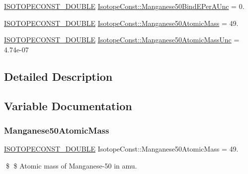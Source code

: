 \begin{DoxyCompactItemize}
\mbox{\hyperlink{group___isotope_const-_macros_ga8f45a7272ce02c0b4c65c44636ed719a}{I\+S\+O\+T\+O\+P\+E\+C\+O\+N\+S\+T\+\_\+\+D\+O\+U\+B\+LE}} \mbox{\hyperlink{group___isotope_const-_manganese-_mn50_gabe7006e5a4406fa0fc6c46e5eb3d907c}{Isotope\+Const\+::\+Manganese50\+Bind\+E\+Per\+A\+Unc}} = 0.
\item 
\mbox{\hyperlink{group___isotope_const-_macros_ga8f45a7272ce02c0b4c65c44636ed719a}{I\+S\+O\+T\+O\+P\+E\+C\+O\+N\+S\+T\+\_\+\+D\+O\+U\+B\+LE}} \mbox{\hyperlink{group___isotope_const-_manganese-_mn50_gadbbf4990db9fc099d645f471e290f6ec}{Isotope\+Const\+::\+Manganese50\+Atomic\+Mass}} = 49.
\item 
\mbox{\hyperlink{group___isotope_const-_macros_ga8f45a7272ce02c0b4c65c44636ed719a}{I\+S\+O\+T\+O\+P\+E\+C\+O\+N\+S\+T\+\_\+\+D\+O\+U\+B\+LE}} \mbox{\hyperlink{group___isotope_const-_manganese-_mn50_gaecb3e3db57f9bc3e25866f63a29f434b}{Isotope\+Const\+::\+Manganese50\+Atomic\+Mass\+Unc}} = 4.\+74e-\/07
\end{DoxyCompactItemize}


\subsection{Detailed Description}


\subsection{Variable Documentation}
\mbox{\label{group___isotope_const-_manganese-_mn50_gadbbf4990db9fc099d645f471e290f6ec}} 
\subsubsection{\texorpdfstring{Manganese50\+Atomic\+Mass}{Manganese50AtomicMass}}
{\footnotesize\ttfamily \mbox{\hyperlink{group___isotope_const-_macros_ga8f45a7272ce02c0b4c65c44636ed719a}{I\+S\+O\+T\+O\+P\+E\+C\+O\+N\+S\+T\+\_\+\+D\+O\+U\+B\+LE}} Isotope\+Const\+::\+Manganese50\+Atomic\+Mass = 49.}

\$ \$ Atomic mass of Manganese-\/50 in amu. \mbox{\label{group___isotope_const-_manganese-_mn50_gaecb3e3db57f9bc3e25866f63a29f434b}} 
